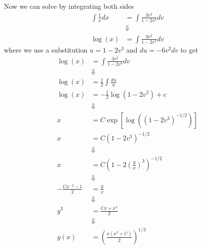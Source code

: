 \documentclass[11pt]{article}
\numberwithin{equation}{section}
\begin{document}
Now we can solve by integrating both sides 
\begin{align*}
\int\frac{1}{x}dx &= \int\frac{3v^2}{1-2v^3}dv\\
&\Downarrow\\
\log(x) &= \int\frac{3v^2}{1-2v^3}dv
\end{align*}
where we use a substitution $u=1-2v^3$ and $du = -6v^2dv$ to get
\begin{align*}
\log(x) &= \int\frac{3v^2}{1-2v^3}dv\\
&\Downarrow\\
\log(x) &= \frac{1}{2}\int\frac{du}{u}\\
\log(x) &= -\frac{1}{2}\log(1-2v^3)+c\\
&\Downarrow\\
x &= C\exp\left[\log((1-2v^3)^{-1/2})\right]\\
x &= C(1-2v^3)^{-1/2}\\
&\Downarrow\\
x &= C\left(1-2\left(\frac{y}{x}\right)^3\right)^{-1/2}\\
&\Downarrow\\
-\frac{Cx^{-2}-1}{2} &= \frac{y}{x}\\
&\Downarrow\\
y^3 &= \frac{Cx+x^3}{2} \\
&\Downarrow\\
y(x) &= \left(\frac{x(x^2+C)}{2}\right)^{1/3}
\end{align*}

\pagebreak
\end{document}
